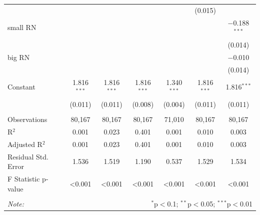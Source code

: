 \begin{tabular}{@{\extracolsep{5pt}}lcccccc}
  &  &  &  &  & (0.015) &  \\ 
  small RN &  &  &  &  &  & $-$0.188$^{***}$ \\ 
  &  &  &  &  &  & (0.014) \\ 
  big RN &  &  &  &  &  & $-$0.010 \\ 
  &  &  &  &  &  & (0.014) \\ 
  Constant & 1.816$^{***}$ & 1.816$^{***}$ & 1.816$^{***}$ & 1.340$^{***}$ & 1.816$^{***}$ & 1.816$^{***}$ \\ 
  & (0.011) & (0.011) & (0.008) & (0.004) & (0.011) & (0.011) \\ 
 \hline \\[-1.8ex] 
Observations & 80,167 & 80,167 & 80,167 & 71,010 & 80,167 & 80,167 \\ 
R$^{2}$ & 0.001 & 0.023 & 0.401 & 0.001 & 0.010 & 0.003 \\ 
Adjusted R$^{2}$ & 0.001 & 0.023 & 0.401 & 0.001 & 0.010 & 0.003 \\ 
Residual Std. Error & 1.536 & 1.519 & 1.190 & 0.537 & 1.529 & 1.534 \\ 
F Statistic p-value & <0.001 & <0.001 & <0.001 & <0.001 & <0.001 & <0.001 \\ 
\hline 
\hline \\[-1.8ex] 
\textit{Note:}  & \multicolumn{6}{r}{$^{*}$p$<$0.1; $^{**}$p$<$0.05; $^{***}$p$<$0.01} \\ 
\end{tabular} 
